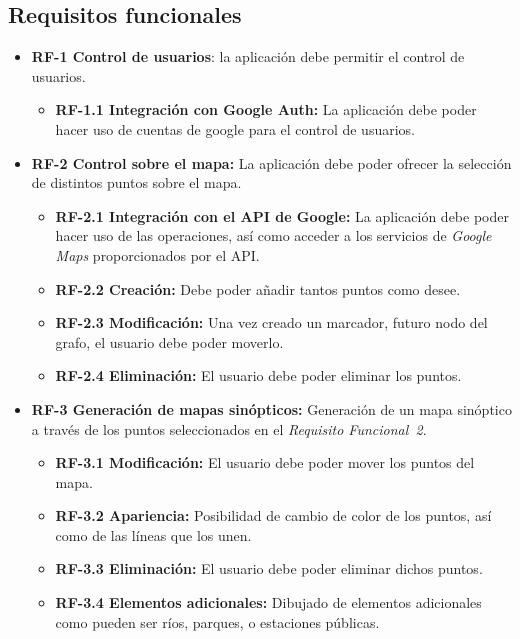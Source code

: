 \subsection{Requisitos funcionales}
\begin{itemize}
	\item \textbf{RF-1 Control de usuarios}: la aplicación debe permitir el control de usuarios.
	\begin{itemize}
		\item \textbf{RF-1.1 Integración con Google Auth:} La aplicación debe poder hacer uso de cuentas de google para el control de usuarios.
	\end{itemize}
	\item \textbf{RF-2 Control sobre el mapa:} La aplicación debe poder ofrecer la selección de distintos puntos sobre el mapa.
	\begin{itemize}
		\item \textbf{RF-2.1 Integración con el API de Google:} La aplicación debe poder hacer uso de las operaciones, así como acceder a los servicios de \textit{Google Maps} proporcionados por el API.
		\item \textbf{RF-2.2 Creación:} Debe poder añadir tantos puntos como desee.
		\item \textbf{RF-2.3 Modificación:} Una vez creado un marcador, futuro nodo del grafo, el usuario debe poder moverlo.
		\item \textbf{RF-2.4 Eliminación:} El usuario debe poder eliminar los puntos.
	\end{itemize}
	\item \textbf{RF-3 Generación de mapas sinópticos:} Generación de un mapa sinóptico a través de los puntos seleccionados en el \textit{Requisito Funcional~2}.
	\begin{itemize}
		\item \textbf{RF-3.1 Modificación:} El usuario debe poder mover los puntos del mapa.
		\item \textbf{RF-3.2 Apariencia:} Posibilidad de cambio de color de los puntos, así como de las líneas que los unen.
		\item \textbf{RF-3.3 Eliminación:} El usuario debe poder eliminar dichos puntos.
		\item \textbf{RF-3.4 Elementos adicionales:} Dibujado de elementos adicionales como pueden ser ríos, parques, o estaciones públicas.
	\end{itemize}
\end{itemize}


